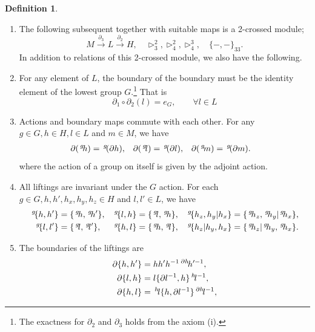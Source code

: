 \documentclass[11pt, reqno]{amsart} %
\newcommand{\act}[1]{\,\sp{#1}\!}
\theoremstyle{definition}
\newtheorem{definition}[theorem]{Definition}
\theoremstyle{remark}
\numberwithin{equation}{section}
\begin{document}
\begin{definition}
\begin{enumerate}
  \item The following subsequent together with suitable maps is a 2-crossed module;
  \begin{equation}
    \label{eq:sub-2CM}
    M\overset{\partial_3}{\longrightarrow} L\overset{\partial_2}{\longrightarrow} H,\quad \triangleright^2_3,\triangleright^2_4,\triangleright^3_4,\quad \{-,-\}_{33}.
  \end{equation}
  In addition to relations of this 2-crossed module, we also have the following.
  \item \label{ax:3CM-exact}For any element of $L$, the boundary of the boundary must be the identity element of the lowest group $G$.\footnote{The exactness for $\partial_2$ and $\partial_3$ holds from the axiom (i).} That is
  \[
    \partial_1\circ\partial_2(l) = e_G,\qquad \forall l\in L
  \]
  \item \label{ax:3CM-BAction}Actions and boundary maps commute with each other. For any $g\in G,h\in H,l\in L$ and $m\in M$, we have
  \begin{align}
    \nonumber
    \partial(\act{g}h) &= \act{g}(\partial h), &
    \partial(\act{g}l) &= \act{g}(\partial l), &
    \partial(\act{g}m) &= \act{g}(\partial m). 
  \end{align}
  where the action of a group on itself is given by the adjoint action.
  \item \label{ax:3CM-ActionLifting}All liftings are invariant under the $G$ action. For each $g\in G,h,h',h_x,h_y,h_z\in H$ and $l,l'\in L$, we have
  \begin{align}
    \nonumber
    \act{g}\{h,h'\} &= \{\act{g}h,\act{g}h'\}, &
    \act{g}\{l,h\} &= \{\act{g}l,\act{g}h\}, &
    \act{g}\{h_z,h_y|h_x\} &= \{\act{g}h_z,\act{g}h_y|\act{g}h_x\}, \\
    \nonumber
    \act{g}\{l,l'\} &= \{\act{g}l,\act{g}l'\}, &
    \act{g}\{h,l\} &= \{\act{g}h,\act{g}l\}, &
    \act{g}\{h_z|h_y,h_x\} &= \{\act{g}h_z|\act{g}h_y,\act{g}h_x\}.
  \end{align}
  \item \label{ax:3CM-BoundaryLiftings}The boundaries of the liftings are
  \begin{align}
    \nonumber
    \partial\{h,h'\} &= hh'h^{-1}\act{\partial h}h'^{-1}, \\
    \label{eq:3CM-bLH}
    \partial\{l,h\} &= l\{\partial l^{-1},h\}\act{h}l^{-1}, \\
    \label{eq:3CM-bHL}
    \partial\{h,l\} &= \act{h}l\{h,\partial l^{-1}\}\act{\partial h}l^{-1}, \\

\end{align}
\end{enumerate}
\end{definition}
\end{document}
